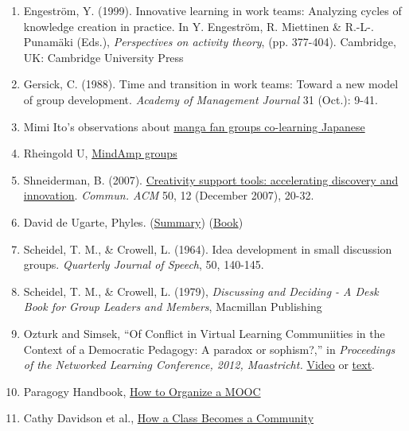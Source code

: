 \begin{enumerate}
\item
  Engeström, Y. (1999). Innovative learning in work teams: Analyzing
  cycles of knowledge creation in practice. In Y. Engeström, R.
  Miettinen \& R.-L-. Punamäki (Eds.), \emph{Perspectives on activity
  theory}, (pp. 377-404). Cambridge, UK: Cambridge University Press
\item
  Gersick, C. (1988). Time and transition in work teams: Toward a new
  model of group development. \emph{Academy of Management Journal} 31
  (Oct.): 9-41.
\item
  Mimi Ito's observations about
  \href{http://mitpress.mit.edu/books/full\_pdfs/hanging\_out.pdf}{manga
  fan groups co-learning Japanese}
\item
  Rheingold U,
  \href{http://socialmediaclassroom.com/host/mindamp5/lockedwiki/main-page}{MindAmp
  groups}
\item
  Shneiderman, B. (2007).
  \href{http://doi.acm.org/10.1145/1323688.1323689}{Creativity support
  tools: accelerating discovery and innovation}. \emph{Commun. ACM} 50,
  12 (December 2007), 20-32. 
\item
  David de Ugarte, Phyles.
  (\href{http://david.lasindias.com/phyles/}{Summary})
  (\href{http://deugarte.com/gomi/phyles.pdf}{Book})
\item
  Scheidel, T. M., \& Crowell, L. (1964). Idea development in small
  discussion groups. \emph{Quarterly Journal of Speech}, 50, 140-145.
\item
  Scheidel, T. M., \& Crowell, L. (1979), \emph{Discussing and Deciding
  - A Desk Book for Group Leaders and Members}, Macmillan Publishing
\item
  Ozturk and Simsek, ``Of Conflict in Virtual Learning Communiities in
  the Context of a Democratic Pedagogy: A paradox or sophism?,'' in
  \emph{Proceedings of the Networked Learning Conference, 2012,
  Maastricht.}
   \href{http://www.google.com/search?client=chrome-mobile\&sourceid=chrome-mobile\&ie=UTF-8\&q=Of+Conflict+in+Virtual+Learning+Communiities+in+the+Context+of+a+Democratic+Pedagogy}{Video}
  or \href{http://networkedlearningconference.org.uk/abstracts/pdf/ozturk.pdf}{text}.
\item
  Paragogy Handbook,
  \href{http://peeragogy.org/organizing-a-learning-context/connectivism-in-practice-how-to-organize-a-mooc/}{How
  to Organize a MOOC}
\item
  Cathy Davidson et al.,
  \href{http://news.rapgenius.com/Cathy-davidson-how-a-class-becomes-a-community-theory-method-examples-chapter-one-lyrics}{How
  a Class Becomes a Community}
\end{enumerate}
